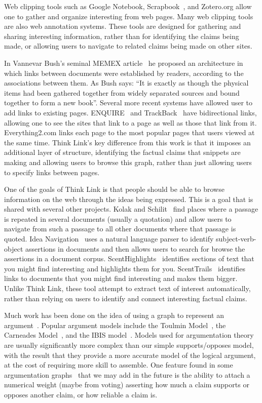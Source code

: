 \documentclass{chi2009}
\begin{document}
Web clipping tools such as Google Notebook, Scrapbook~\cite{scrapbook}, and Zotero.org allow one to gather and organize interesting from web pages. Many web clipping tools are also web annotation systems. These tools are designed for gathering and sharing interesting information, rather than for identifying the claims being made, or allowing users to navigate to related claims being made on other sites.

In Vannevar Bush's seminal MEMEX article~\cite{memex} he proposed an architecture in which links between documents were established by readers, according to the associations between them. As Bush says: ``It is exactly as though the physical items had been gathered together from widely separated sources and bound together to form a new book''. Several more recent systems have allowed user to add links to existing pages. ENQUIRE~\cite{weavingtheweb} and TrackBack~\cite{trackback} have bidirectional links, allowing one to see the sites that link to a page as well as those that link from it. Everything2.com links each page to the most popular pages that users viewed at the same time. Think Link's key difference from this work is that it imposes an additional layer of structure, identifying the factual claims that snippets are making and allowing users to browse this graph, rather than just allowing users to specify links between pages.

One of the goals of Think Link is that people should be able to browse information on the web through the ideas being expressed. This is a goal that is shared with several other projects. Kolak and Schilit~\cite{quotations} find places where a passage is repeated in several documents (usually a quotation) and allow users to navigate from such a passage to all other documents where that passage is quoted. Idea Navigation~\cite{ideanavigation} uses a natural language parser to identify subject-verb-object assertions in documents and then allows users to search for browse the assertions in a document corpus. ScentHighlights~\cite{scenthighlights} identifies sections of text that you might find interesting and highlights them for you. ScentTrails~\cite{scenttrails} identifies links to documents that you might find interesting and makes them bigger. Unlike Think Link, these tool attempt to extract text of interest automatically, rather than relying on users to identify and connect interesting factual claims.

Much work has been done on the idea of using a graph to represent an argument~\cite{argumentation,argmas}. Popular argument models include the Toulmin Model~\cite{toulmin}, the Carneades Model~\cite{carneades}, and the IBIS model~\cite{ibis}. Models used for argumentation theory are usually significantly more complex than our simple supports/opposes model, with the result that they provide a more accurate model of the logical argument, at the cost of requiring more skill to assemble. One feature found in some argumentation graphs~\cite{Korb97acognitive} that we may add in the future is the ability to attach a numerical weight (maybe from voting) asserting how much a claim supports or opposes another claim, or how reliable a claim is.
\end{document}
